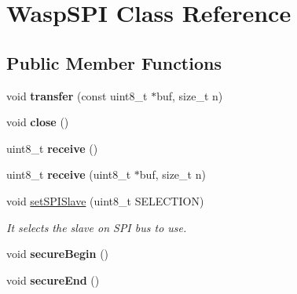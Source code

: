 \hypertarget{class_wasp_s_p_i}{}\section{Wasp\+S\+PI Class Reference}
\label{class_wasp_s_p_i}
\subsection*{Public Member Functions}
\begin{DoxyCompactItemize}
\item 
void {\bfseries transfer} (const uint8\+\_\+t $\ast$buf, size\+\_\+t n)\hypertarget{class_wasp_s_p_i_ae23b2b86f99d52781ee2c05c691541de}{}\label{class_wasp_s_p_i_ae23b2b86f99d52781ee2c05c691541de}

\item 
void {\bfseries close} ()\hypertarget{class_wasp_s_p_i_a235d2156504151df73833afeae8a7853}{}\label{class_wasp_s_p_i_a235d2156504151df73833afeae8a7853}

\item 
uint8\+\_\+t {\bfseries receive} ()\hypertarget{class_wasp_s_p_i_af76a6bd028a8b202fa6253211a434718}{}\label{class_wasp_s_p_i_af76a6bd028a8b202fa6253211a434718}

\item 
uint8\+\_\+t {\bfseries receive} (uint8\+\_\+t $\ast$buf, size\+\_\+t n)\hypertarget{class_wasp_s_p_i_a46044a06c8549347785f9adab3d516cc}{}\label{class_wasp_s_p_i_a46044a06c8549347785f9adab3d516cc}

\item 
void \hyperlink{class_wasp_s_p_i_a98556d98b9778425edc224edc4c923e7}{set\+S\+P\+I\+Slave} (uint8\+\_\+t S\+E\+L\+E\+C\+T\+I\+ON)
\begin{DoxyCompactList}\small\item\em It selects the slave on S\+PI bus to use. \end{DoxyCompactList}\item 
void {\bfseries secure\+Begin} ()\hypertarget{class_wasp_s_p_i_af6b0323a716f960812b9aabe7f5949f0}{}\label{class_wasp_s_p_i_af6b0323a716f960812b9aabe7f5949f0}

\item 
void {\bfseries secure\+End} ()\hypertarget{class_wasp_s_p_i_a6a29c51db00fdfedd4711048c8aaea5e}{}\label{class_wasp_s_p_i_a6a29c51db00fdfedd4711048c8aaea5e}

\end{DoxyCompactItemize}
